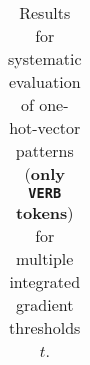 \begin{table}[t]
\begin{tabular}{lllllll}

\hline
\end{tabular}
\caption[Model Evaluation for only \texttt{VERB} tokens]{Results for systematic evaluation of one-hot-vector patterns (\textbf{only \texttt{VERB} tokens}) for multiple integrated gradient thresholds $t$.}
\label{tab:evalResultsVERB}
\end{table}
	